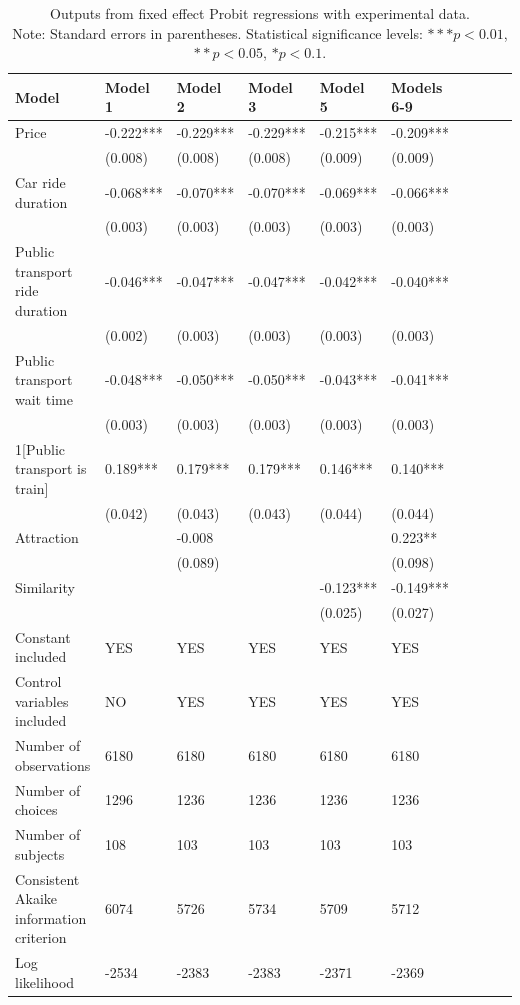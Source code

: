 \documentclass[a4paper,12pt]{article}
\begin{document}
\clearpage
\newpage
\clearpage
\begin{table}
    \centering
    \scriptsize
    \begin{tabular}{p{5.3cm}*{9}{p{1.5cm}}}
    \toprule
    Model & Model 1 & Model 2 & Model 3 & Model 5 & Models 6-9 \\
    \midrule
    Price & -0.222*** & -0.229*** & -0.229*** & -0.215*** & -0.209*** \\
     & (0.008) & (0.008) & (0.008) & (0.009) & (0.009) \\
    Car ride duration & -0.068*** & -0.070*** & -0.070*** & -0.069*** & -0.066*** \\
     & (0.003) & (0.003) & (0.003) & (0.003) & (0.003) \\
    Public transport ride duration & -0.046*** & -0.047*** & -0.047*** & -0.042*** & -0.040*** \\
     & (0.002) & (0.003) & (0.003) & (0.003) & (0.003) \\
    Public transport wait time & -0.048*** & -0.050*** & -0.050*** & -0.043*** & -0.041*** \\
     & (0.003) & (0.003) & (0.003) & (0.003) & (0.003) \\
    1[Public transport is train] & 0.189*** & 0.179*** & 0.179*** & 0.146*** & 0.140*** \\
     & (0.042) & (0.043) & (0.043) & (0.044) & (0.044) \\
    Attraction & & -0.008 & & & 0.223** \\
     & & (0.089) & & & (0.098) \\
    Similarity & & & & -0.123*** & -0.149*** \\
     & & & & (0.025) & (0.027) \\
    Constant included & YES & YES & YES & YES & YES \\
    Control variables included & NO & YES & YES & YES & YES \\
    Number of observations & 6180 & 6180 & 6180 & 6180 & 6180 \\
    Number of choices & 1296 & 1236 & 1236 & 1236 & 1236 \\
    Number of subjects & 108 & 103 & 103 & 103 & 103 \\
    Consistent Akaike information criterion & 6074 & 5726 & 5734 & 5709 & 5712 \\
    Log likelihood & -2534 & -2383 & -2383 & -2371 & -2369 \\

    \bottomrule
    \end{tabular}
    \caption[Fixed effect Probit results for experimental data]{Outputs from fixed effect Probit regressions with experimental data.\\ Note: Standard errors in parentheses. Statistical significance levels: $*** p<0.01$, $** p<0.05$, $* p<0.1$.}
    \label{tab:fixedProbitExperimentalData}
\end{table}
\clearpage
\newpage
\end{document}
